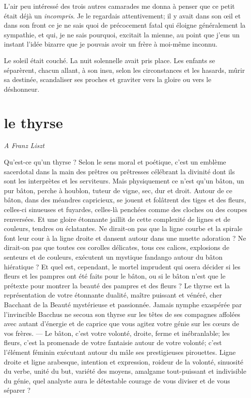 L’air peu intéressé des trois autres camarades me donna
à penser que ce petit était déjà un \textit{incompris}. Je le regardais
attentivement; il y avait dans son \oe il et dans son front ce je ne sais
quoi de précocement fatal qui éloigne généralement la sympathie, et
qui, je ne sais pourquoi, excitait la mienne, au point que
j’eus un instant l’idée bizarre que
je pouvais avoir un frère à moi{}-même inconnu.

Le soleil était couché. La nuit solennelle avait pris place. Les enfants
se séparèrent, chacun allant, à son insu, selon les circonstances et
les hasards, mûrir sa destinée, scandaliser ses proches et graviter
vers la gloire ou vers le déshonneur.


\quebra\section[Le thyrse]{le thyrse}
 
\begin{flushright}
\textit{A Franz Liszt}
\end{flushright}

Qu’est{}-ce qu’un thyrse ? Selon le
sens moral et poétique, c’est un emblème sacerdotal
dans la main des prêtres ou prêtresses célébrant la divinité dont ils
sont les interprètes et les serviteurs. Mais physiquement ce
n’est qu’un bâton, un pur bâton,
perche à houblon, tuteur de vigne, sec, dur et droit. Autour de ce
bâton, dans des méandres capricieux, se jouent et folâtrent des tiges
et des fleurs, celles{}-ci sinueuses et fuyardes, celles{}-là penchées
comme des cloches ou des coupes renversées. Et une gloire étonnante
jaillit de cette complexité de lignes et de couleurs, tendres ou
éclatantes. Ne dirait{}-on pas que la ligne courbe et la spirale font
leur cour à la ligne droite et dansent autour dans une muette adoration
? Ne dirait{}-on pas que toutes ces corolles délicates, tous ces
calices, explosions de senteurs et de couleurs, exécutent un mystique
fandango autour du bâton hiératique ? Et quel est, cependant, le mortel
imprudent qui osera décider si les fleurs et les pampres ont été faits
pour le bâton, ou si le bâton n’est que le prétexte
pour montrer la beauté des pampres et des fleurs ? Le thyrse est la
représentation de votre étonnante dualité, maître puissant et vénéré,
cher Bacchant de la Beauté mystérieuse et passionnée. Jamais nymphe
exaspérée par l’invincible Bacchus ne secoua son
thyrse sur les têtes de ses compagnes affolées avec autant
d’énergie et de caprice que vous agitez votre génie
sur les c\oe urs de vos frères. --- Le bâton, c’est votre
volonté, droite, ferme et inébranlable; les fleurs,
c’est la promenade de votre fantaisie autour de votre
volonté; c’est l’élément féminin
exécutant autour du mâle ses prestigieuses pirouettes. Ligne droite et
ligne arabesque, intention et expression, roideur de la volonté,
sinuosité du verbe, unité du but, variété des moyens, amalgame
tout{}-puissant et indivisible du génie, quel analyste aura le
détestable courage de vous diviser et de vous séparer ?

